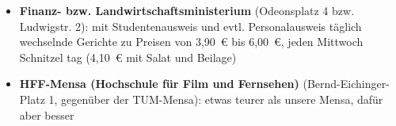 \begin{itemize}
	\item \textbf{Finanz- bzw. Landwirtschaftsministerium} (Odeonsplatz 4 bzw. Ludwigstr. 2): mit Studentenausweis 		und evtl. Personalausweis täglich wechselnde Gerichte zu Preisen von 3,90~€ bis 6,00~€, jeden Mittwoch Schnitzel		tag (4,10~€ mit Salat und Beilage)
	
	\item \textbf{HFF-Mensa (Hochschule für Film und Fernsehen)}
          (Bernd-Eichinger-Platz 1, gegenüber der TUM-Mensa): etwas
          teurer als unsere Mensa, dafür aber besser
\end{itemize}

\begin{urlList}
\end{urlList}
